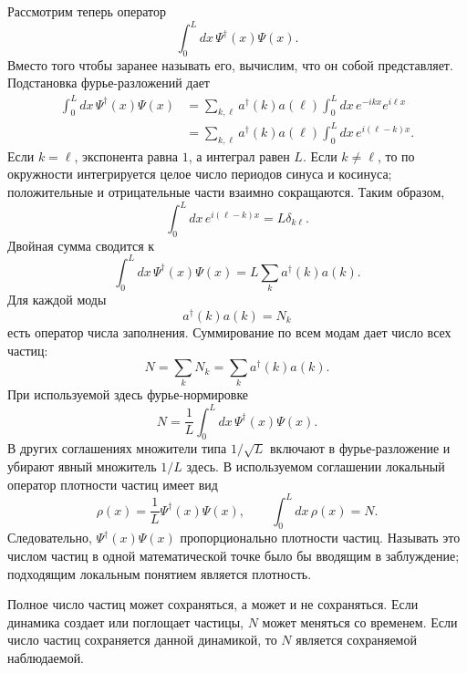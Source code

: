 Рассмотрим теперь оператор
\begin{equation}
\int_0^L dx\,\Psi^\dagger(x)\Psi(x).
\end{equation}
Вместо того чтобы заранее называть его, вычислим, что он собой представляет. Подстановка фурье-разложений дает
\begin{align}
\int_0^L dx\,\Psi^\dagger(x)\Psi(x)
&=
\sum_{k,\ell}a^\dagger(k)a(\ell)
\int_0^L dx\,e^{-ikx}e^{i\ell x}
\\
&=
\sum_{k,\ell}a^\dagger(k)a(\ell)
\int_0^L dx\,e^{i(\ell-k)x}.
\end{align}
Если \(k=\ell\), экспонента равна \(1\), а интеграл равен \(L\). Если \(k\ne\ell\), то по окружности интегрируется целое число периодов синуса и косинуса; положительные и отрицательные части взаимно сокращаются. Таким образом,
\begin{equation}
\int_0^L dx\,e^{i(\ell-k)x}=L\delta_{k\ell}.
\end{equation}
Двойная сумма сводится к
\begin{equation}
\int_0^L dx\,\Psi^\dagger(x)\Psi(x)
=L\sum_k a^\dagger(k)a(k).
\end{equation}
Для каждой моды
\begin{equation}
a^\dagger(k)a(k)=N_k
\end{equation}
есть оператор числа заполнения. Суммирование по всем модам дает число всех частиц:
\begin{equation}
N=\sum_k N_k=\sum_k a^\dagger(k)a(k).
\end{equation}
При используемой здесь фурье-нормировке
\begin{equation}
N=\frac{1}{L}\int_0^L dx\,
\Psi^\dagger(x)\Psi(x).
\end{equation}
В других соглашениях множители типа \(1/\sqrt{L}\) включают в фурье-разложение и убирают явный множитель \(1/L\) здесь. В используемом соглашении локальный оператор плотности частиц имеет вид
\begin{equation}
\rho(x)=\frac{1}{L}\Psi^\dagger(x)\Psi(x),
\qquad
\int_0^L dx\,\rho(x)=N.
\end{equation}
Следовательно, \(\Psi^\dagger(x)\Psi(x)\) пропорционально плотности частиц. Называть это числом частиц в одной математической точке было бы вводящим в заблуждение; подходящим локальным понятием является плотность.

Полное число частиц может сохраняться, а может и не сохраняться. Если динамика создает или поглощает частицы, \(N\) может меняться со временем. Если число частиц сохраняется данной динамикой, то \(N\) является сохраняемой наблюдаемой.

